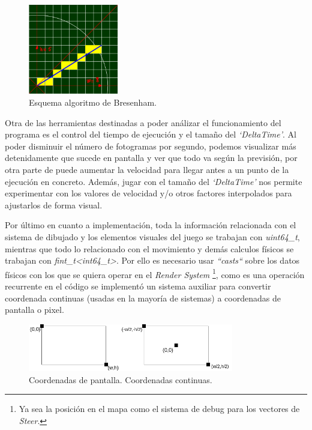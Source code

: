 \begin{figure}[ht]
\centering
\includegraphics[width=0.35\textwidth]{imagenes/diario_desarrollo/linea_ideal.png}
\caption{Esquema algoritmo de Bresenham.}
\label{fig:bresenham}
\end{figure} 

Otra de las herramientas destinadas a poder análizar el funcionamiento del programa es
el control del tiempo de ejecución y el tamaño del \textit{`DeltaTime'}. Al poder disminuir
el número de fotogramas por segundo, podemos visualizar más detenidamente que sucede en
pantalla y ver que todo va según la previsión, por otra parte de puede aumentar la velocidad
para llegar antes a un punto de la ejecución en concreto. Además, jugar con el tamaño del
\textit{`DeltaTime'} nos permite experimentar con los valores de velocidad y/o otros factores
interpolados para ajustarlos de forma visual. 

Por último en cuanto a implementación, toda la información relacionada con el sistema de 
dibujado y los elementos visuales del juego se trabajan con \textit{uint64\_t}, mientras que
todo lo relacionado con el movimiento y demás calculos físicos se trabajan con
\textit{fint\_t\textless int64\_t\textgreater}. Por ello es necesario usar \textit{``casts``}
sobre los datos físicos con los que se quiera operar en el \textit{Render System}
\footnote{Ya sea la posición en el mapa como el sistema de debug para los vectores de
\textit{Steer}.}, como es una operación recurrente en el código se implementó un sistema 
auxiliar para convertir coordenada continuas (usadas en la mayoría de sistemas) a coordenadas de 
pantalla o pixel. 

\begin{figure}[ht]
\centering
\includegraphics[width=0.8\textwidth]{imagenes/diario_desarrollo/sis_coords.png}\\
\hspace{-8mm} Coordenadas de pantalla. \hspace{16mm}  Coordenadas continuas.
\label{fig:sis_coords}
\end{figure} 

